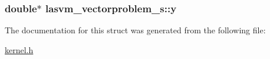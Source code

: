 \hypertarget{structlasvm__vectorproblem__s_a21b068e93b4cd15dbd00895c752de5a7}{
\subsubsection[{y}]{\setlength{\rightskip}{0pt plus 5cm}double$\ast$ lasvm\+\_\+vectorproblem\+\_\+s\+::y}}\label{structlasvm__vectorproblem__s_a21b068e93b4cd15dbd00895c752de5a7}


The documentation for this struct was generated from the following file\+:\begin{DoxyCompactItemize}
\item 
\hyperlink{kernel_8h}{kernel.\+h}\end{DoxyCompactItemize}
